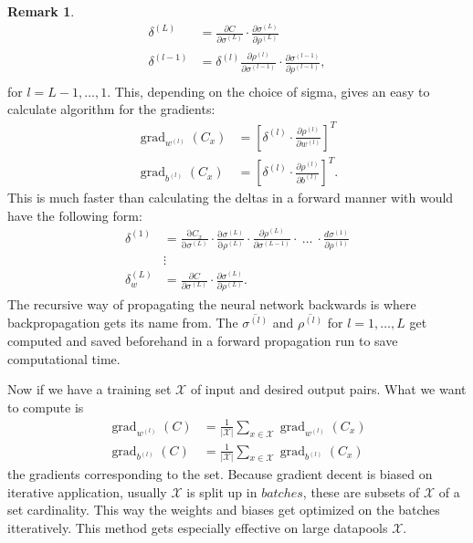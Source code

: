 \documentclass{article}
\theoremstyle{definition}
\newtheorem{remark}[theorem]{Remark}
\DeclareMathOperator{\grad}{grad}
\begin{document}
\begin{remark}
\begin{align*}
\delta^{(L)} &= \frac{\partial C}{\partial \sigma^{(L)}} \cdot \frac{\partial \sigma^{(L)}}{\partial \rho^{(L)}} \\
\delta^{(l-1)} &= \delta^{(l)} \frac{\partial \rho^{(l)}}{\partial \sigma^{(l-1)}} \cdot \frac{\partial \sigma^{(l-1)}}{\partial \rho^{(l-1)}}, \\
\end{align*}
for $l=L-1, \dots, 1$.
This, depending on the choice of sigma, gives an easy to calculate algorithm for the gradients:
\begin{align*}
\grad_{w^{(l)}}(C_x) &= \left[\delta^{(l)} \cdot \frac{\partial \rho^{(l)}}{\partial w^{(l)}}\right]^{T} \\
\grad_{b^{(l)}}(C_x) &= \left[\delta^{(l)} \cdot \frac{\partial \rho^{(l)}}{\partial b^{(l)}}\right]^{T}.
\end{align*}
This is much faster than calculating the deltas in a forward manner with would have the following form:
\begin{align*}
\delta^{(1)} &= \frac{\mathrm \partial C_{x}}{\mathrm \partial \sigma^{(L)}} \cdot \frac{\mathrm \partial \sigma^{(L)}}{\mathrm \partial \rho^{(L)}} \cdot \frac{\partial \rho^{(L)}}{\partial \sigma^{(L-1)}} \cdot \ \ldots \ \cdot \frac{d \sigma^{(1)}}{\partial \rho^{(1)}} \\
&\vdots \\
\delta^{(L)}_{w} &= \frac{\partial C}{\partial \sigma^{(L)}} \cdot \frac{\partial \sigma^{(L)}}{\partial \rho^{(L)}}.
\end{align*}
The recursive way of propagating the neural network backwards is where backpropagation gets its name from. The $\overline{\sigma^{(l)}}$ and $\overline{\rho^{(l)}}$ for $l = 1, \dots , L$ get computed and saved beforehand in a forward propagation run to save computational time.

Now if we have a training set $\mathcal{X}$ of input and desired output pairs. What we want to compute is
\begin{align*}
\grad_{w^{(l)}}(C) &= \frac{1}{|\mathcal{X}|}\sum_{x \in \mathcal{X}}\grad_{w^{(l)}}(C_x) \\
\grad_{b^{(l)}}(C) &= \frac{1}{|\mathcal{X}|}\sum_{x \in \mathcal{X}}\grad_{b^{(l)}}(C_x)
\end{align*}
the gradients corresponding to the set. Because gradient decent is biased on iterative application, usually $\mathcal{X}$ is split up in $batches$, these are subsets of $\mathcal{X}$ of a set cardinality. This way the weights and biases get optimized on the batches itteratively. This method gets especially effective on large datapools $\mathcal{X}$.
\end{remark}
\end{document}
